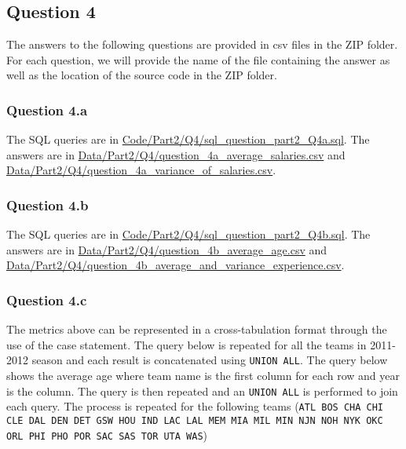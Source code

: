 
\subsection{Question 4}
\label{subsec:414}

The answers to the following questions are provided in csv files in the ZIP folder. For each question, we will provide the name of the file containing the answer as well as the location of the source code in the ZIP folder.

\subsubsection{Question 4.a}
\label{subsubsec:414a}

The SQL queries are in \url{Code/Part2/Q4/sql_question_part2_Q4a.sql}. The answers are in \url{Data/Part2/Q4/question_4a_average_salaries.csv} and \url{Data/Part2/Q4/question_4a_variance_of_salaries.csv}.

\subsubsection{Question 4.b}
\label{subsubsec:414b}

The SQL queries are in \url{Code/Part2/Q4/sql_question_part2_Q4b.sql}. The answers are in \url{Data/Part2/Q4/question_4b_average_age.csv} and \url{Data/Part2/Q4/question_4b_average_and_variance_experience.csv}.

\subsubsection{Question 4.c}
\label{subsubsec:414c}

The metrics above can be represented in a cross-tabulation format through the use of the case statement. The query below is repeated for all the teams in 2011-2012 season and each result is concatenated using \verb|UNION ALL|.
The query below shows the average age where team name is the first column for each row and year is the column. The query is then repeated and an \verb|UNION ALL| is performed to join each query. The process is repeated for the following teams (\verb|ATL BOS CHA CHI CLE DAL DEN DET GSW HOU IND LAC LAL MEM MIA MIL MIN NJN NOH NYK OKC ORL PHI PHO POR SAC SAS TOR UTA WAS|)
